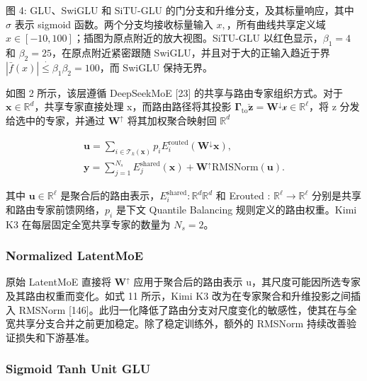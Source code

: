 \documentclass[
  10
]{article}
\begin{document}
图 4: GLU、SwiGLU 和 SiTU-GLU 的门分支和升维分支，及其标量响应，其中 \(\sigma\) 表示 sigmoid 函数。两个分支均接收标量输入 \(x ,\)，所有曲线共享定义域 \(x \in [ - 1 0 \widehat { , } 1 0 0 ]\)；插图为原点附近的放大视图。SiTU-GLU 以红色显示，\(\beta _ { 1 } = 4\) 和 \(\beta _ { 2 } = 2 5\)，在原点附近紧密跟随 SwiGLU，并且对于大的正输入趋近于界 \(| \bar { f } ( x ) | \overset { \cdot } { \leq } \beta _ { 1 } \beta _ { 2 } = 1 0 0\)，而 SwiGLU 保持无界。

如图 2 所示，该层遵循 DeepSeekMoE {[}23{]} 的共享与路由专家组织方式。对于 \(\pmb { x } \in \mathbb { R } ^ { d }\)，共享专家直接处理 x，而路由路径将其投影 \(\mathbf { \Gamma } _ { \mathrm { t o } } \mathbf { \check { z } } = \mathbf { W } ^ { \downarrow } \mathbf { \mathcal { x } } \in \mathbb { R } ^ { \ell }\)，将 z 分发给选中的专家，并通过 \(\mathbf { W } ^ { \uparrow }\) 将其加权聚合映射回 \(\mathbb { R } ^ { d }\)

\[
\begin{array}{l} \boldsymbol {u} = \sum_ {i \in \mathcal {T} _ {k} (\boldsymbol {x})} p _ {i} E _ {i} ^ {\text {routed}} (\mathbf {W} ^ {\downarrow} \boldsymbol {x}), \\ \boldsymbol {y} = \sum_ {j = 1} ^ {N _ {s}} E _ {j} ^ {\text {shared}} (\boldsymbol {x}) + \mathbf {W} ^ {\uparrow} \text {RMSNorm} (\boldsymbol {u}). \end{array}\tag{11}
\]

其中 \(\mathbf { \boldsymbol { u } } \in \mathbb { R } ^ { \ell }\) 是聚合后的路由表示，\(E _ { i } ^ { \mathrm { s h a r e d } } : \mathbb { R } ^ { d }  \mathbb { R } ^ { d }\) 和 Erouted : \(\mathbb { R } ^ { \ell } \to \mathbb { R } ^ { \ell }\) 分别是共享和路由专家前馈网络，\(p _ { i }\) 是下文 Quantile Balancing 规则定义的路由权重。Kimi K3 在每层固定全宽共享专家的数量为 \(N _ { s } = 2\)。

\subsubsection{Normalized LatentMoE}\label{normalized-latentmoe}

原始 LatentMoE 直接将 \(\mathbf { W } ^ { \uparrow }\) 应用于聚合后的路由表示 u，其尺度可能因所选专家及其路由权重而变化。如式 11 所示，Kimi K3 改为在专家聚合和升维投影之间插入 RMSNorm {[}146{]}。此归一化降低了路由分支对尺度变化的敏感性，使其在与全宽共享分支合并之前更加稳定。除了稳定训练外，额外的 RMSNorm 持续改善验证损失和下游基准。

\subsubsection{Sigmoid Tanh Unit GLU}\label{sigmoid-tanh-unit-glu}
\end{document}
